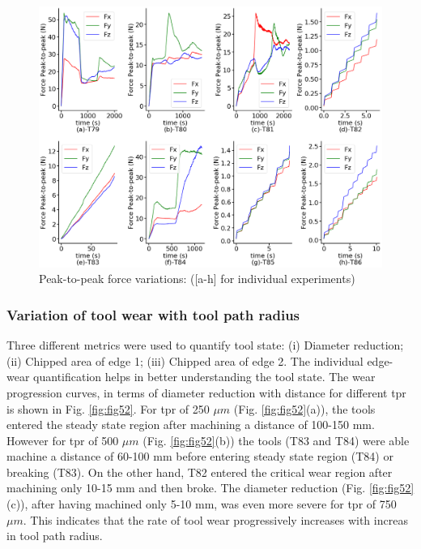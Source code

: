 \documentclass[preprint,review,12pt]{elsarticle}
\begin{document}
\begin{figure}[!h]
  \begin{center}
    \includegraphics[width=\linewidth]{51.png}
    \caption{Peak-to-peak force variations: ([a-h] for individual experiments)}\label{fig:fig51}
  \end{center}
\end{figure}

\subsubsection{Variation of tool wear with tool path radius}
Three different metrics were used to quantify tool state: (i) Diameter reduction; (ii) Chipped area of edge 1; (iii) Chipped area of edge 2. The individual edge-wear quantification helps in better understanding the tool state. The wear progression curves, in terms of diameter reduction with distance for different tpr is shown in Fig. \ref{fig:fig52}. For tpr of 250 $\mu{m}$ (Fig. \ref{fig:fig52}(a)), the tools entered the steady state region after machining a distance of 100-150 mm. However for tpr of 500 $\mu{m}$ (Fig. \ref{fig:fig52}(b)) the tools (T83 and T84) were able machine a distance of 60-100 mm before entering steady state region (T84) or breaking (T83). On the other hand, T82 entered the critical wear region after machining only 10-15 mm and then broke. The diameter reduction (Fig. \ref{fig:fig52}(c)), after having machined only 5-10 mm, was even more severe for tpr of 750 $\mu{m}$. This indicates that the rate of tool wear progressively increases with increas in tool path radius. \par
\end{document}
